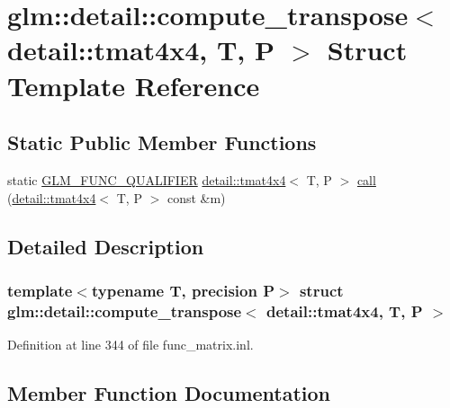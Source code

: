 \hypertarget{structglm_1_1detail_1_1compute__transpose_3_01detail_1_1tmat4x4_00_01_t_00_01_p_01_4}{}\section{glm\+:\+:detail\+:\+:compute\+\_\+transpose$<$ detail\+:\+:tmat4x4, T, P $>$ Struct Template Reference}
\label{structglm_1_1detail_1_1compute__transpose_3_01detail_1_1tmat4x4_00_01_t_00_01_p_01_4}
\subsection*{Static Public Member Functions}
\begin{DoxyCompactItemize}
\item 
static \hyperlink{setup_8hpp_a33fdea6f91c5f834105f7415e2a64407}{G\+L\+M\+\_\+\+F\+U\+N\+C\+\_\+\+Q\+U\+A\+L\+I\+F\+I\+ER} \hyperlink{structglm_1_1detail_1_1tmat4x4}{detail\+::tmat4x4}$<$ T, P $>$ \hyperlink{structglm_1_1detail_1_1compute__transpose_3_01detail_1_1tmat4x4_00_01_t_00_01_p_01_4_af9f856179336704a2eab5c72c6ef79e4}{call} (\hyperlink{structglm_1_1detail_1_1tmat4x4}{detail\+::tmat4x4}$<$ T, P $>$ const \&m)
\end{DoxyCompactItemize}


\subsection{Detailed Description}
\subsubsection*{template$<$typename T, precision P$>$\newline
struct glm\+::detail\+::compute\+\_\+transpose$<$ detail\+::tmat4x4, T, P $>$}



Definition at line 344 of file func\+\_\+matrix.\+inl.



\subsection{Member Function Documentation}
\mbox{\label{structglm_1_1detail_1_1compute__transpose_3_01detail_1_1tmat4x4_00_01_t_00_01_p_01_4_af9f856179336704a2eab5c72c6ef79e4}} 
